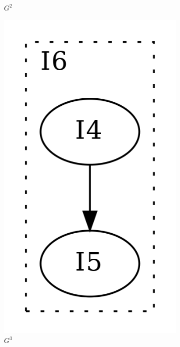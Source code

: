 \documentclass[aspectratio=1610]{beamer}
\begin{document}
\begin{frame}
\begin{figure}[htbp]
\begin{subfigure}[b]{0.10\textwidth}
			\caption{$G^2$}
		\end{subfigure}
		\qquad
		\begin{subfigure}[b]{0.10\textwidth}
			\centering
			\includegraphics[width=\textwidth]{inc/methods/interval/G_3.png}
			\caption{$G^3$}
		\end{subfigure}
		\qquad
		\begin{subfigure}[b]{0.06\textwidth}

\end{subfigure}
\end{figure}
\end{frame}
\end{document}
